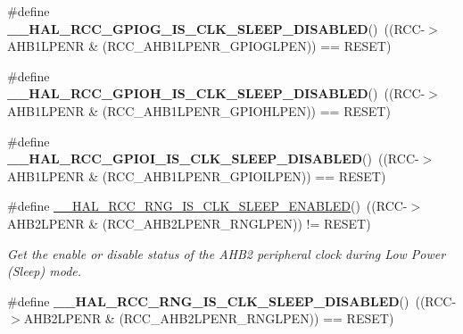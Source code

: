 \begin{DoxyCompactItemize}
\item 
\mbox{\label{group___r_c_c___clock___sleep___enable___disable___status_ga965ed6d910633d0f9006e287f96bbc68}} 
\#define {\bfseries \+\_\+\+\_\+\+H\+A\+L\+\_\+\+R\+C\+C\+\_\+\+G\+P\+I\+O\+G\+\_\+\+I\+S\+\_\+\+C\+L\+K\+\_\+\+S\+L\+E\+E\+P\+\_\+\+D\+I\+S\+A\+B\+L\+ED}()~((R\+CC-\/$>$A\+H\+B1\+L\+P\+E\+NR \& (R\+C\+C\+\_\+\+A\+H\+B1\+L\+P\+E\+N\+R\+\_\+\+G\+P\+I\+O\+G\+L\+P\+EN)) == R\+E\+S\+ET)
\item 
\mbox{\label{group___r_c_c___clock___sleep___enable___disable___status_gae53e66bfd35d315af80f7d33a811de7c}} 
\#define {\bfseries \+\_\+\+\_\+\+H\+A\+L\+\_\+\+R\+C\+C\+\_\+\+G\+P\+I\+O\+H\+\_\+\+I\+S\+\_\+\+C\+L\+K\+\_\+\+S\+L\+E\+E\+P\+\_\+\+D\+I\+S\+A\+B\+L\+ED}()~((R\+CC-\/$>$A\+H\+B1\+L\+P\+E\+NR \& (R\+C\+C\+\_\+\+A\+H\+B1\+L\+P\+E\+N\+R\+\_\+\+G\+P\+I\+O\+H\+L\+P\+EN)) == R\+E\+S\+ET)
\item 
\mbox{\label{group___r_c_c___clock___sleep___enable___disable___status_gaa36c8ec6073b3e4c1f6ddf5c21bd66da}} 
\#define {\bfseries \+\_\+\+\_\+\+H\+A\+L\+\_\+\+R\+C\+C\+\_\+\+G\+P\+I\+O\+I\+\_\+\+I\+S\+\_\+\+C\+L\+K\+\_\+\+S\+L\+E\+E\+P\+\_\+\+D\+I\+S\+A\+B\+L\+ED}()~((R\+CC-\/$>$A\+H\+B1\+L\+P\+E\+NR \& (R\+C\+C\+\_\+\+A\+H\+B1\+L\+P\+E\+N\+R\+\_\+\+G\+P\+I\+O\+I\+L\+P\+EN)) == R\+E\+S\+ET)
\item 
\#define \mbox{\hyperlink{group___r_c_c___clock___sleep___enable___disable___status_ga536dc31ed0e24ad8b82f5b8c2a920b42}{\+\_\+\+\_\+\+H\+A\+L\+\_\+\+R\+C\+C\+\_\+\+R\+N\+G\+\_\+\+I\+S\+\_\+\+C\+L\+K\+\_\+\+S\+L\+E\+E\+P\+\_\+\+E\+N\+A\+B\+L\+ED}}()~((R\+CC-\/$>$A\+H\+B2\+L\+P\+E\+NR \& (R\+C\+C\+\_\+\+A\+H\+B2\+L\+P\+E\+N\+R\+\_\+\+R\+N\+G\+L\+P\+EN)) != R\+E\+S\+ET)
\begin{DoxyCompactList}\small\item\em Get the enable or disable status of the A\+H\+B2 peripheral clock during Low Power (Sleep) mode. \end{DoxyCompactList}\item 
\mbox{\label{group___r_c_c___clock___sleep___enable___disable___status_gac7b5c1c60774ca2af36591d897eb352b}} 
\#define {\bfseries \+\_\+\+\_\+\+H\+A\+L\+\_\+\+R\+C\+C\+\_\+\+R\+N\+G\+\_\+\+I\+S\+\_\+\+C\+L\+K\+\_\+\+S\+L\+E\+E\+P\+\_\+\+D\+I\+S\+A\+B\+L\+ED}()~((R\+CC-\/$>$A\+H\+B2\+L\+P\+E\+NR \& (R\+C\+C\+\_\+\+A\+H\+B2\+L\+P\+E\+N\+R\+\_\+\+R\+N\+G\+L\+P\+EN)) == R\+E\+S\+ET)

\end{DoxyCompactItemize}
